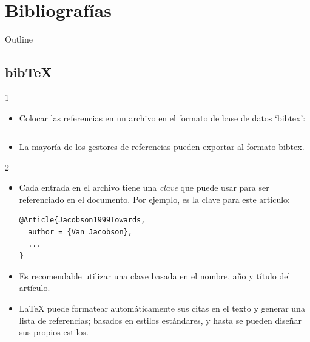 \documentclass{beamer}
\begin{document}
\section{Bibliografías}

\begin{frame}{Outline}
  \begin{multicols}{2}
    \tableofcontents[currentsection]
  \end{multicols}
\end{frame}

\subsection{bib\TeX}
\begin{frame}[fragile]{\insertsubsection{} 1}
  \begin{itemize}
  \item Colocar las referencias en un archivo  en el
    formato de base de datos  `bibtex':
    \inputminted[fontsize=\scriptsize,frame=single]{latex}{bib-example.bib}
  \item La mayoría de los gestores de referencias pueden exportar al
    formato bibtex.
  \end{itemize}
\end{frame}

\begin{frame}[fragile]{\insertsubsection{} 2}
  \begin{itemize}
  \item Cada entrada en el archivo   tiene una \emph{clave}
    que puede usar para ser referenciado en el documento. Por ejemplo,
     es la clave para este artículo:
    \begin{verbatim}
@Article{Jacobson1999Towards,
  author = {Van Jacobson},
  ...
}
    \end{verbatim}
  \item Es recomendable utilizar una clave basada en el nombre, año y
    título del artículo.
  \item \LaTeX{} puede formatear automáticamente sus citas en el texto
    y generar una lista de referencias; basados en estilos estándares,
    y hasta se pueden diseñar sus propios estilos.
  \end{itemize}
\end{frame}
\end{document}
